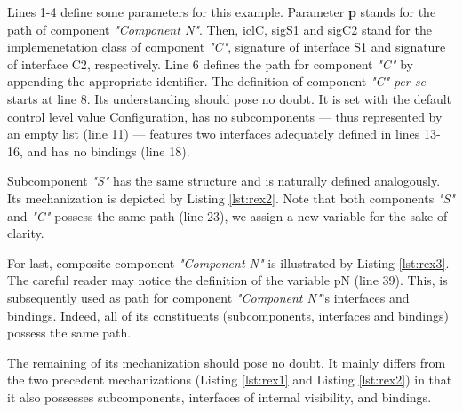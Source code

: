 	
	\noindent Lines 1-4 define some parameters for this example. Parameter \textbf{p}
	stands for the \textsf{path} of \textsf{component} \textit{"Component N"}. Then,
	 \textsf{iclC}, \textsf{sigS1} and \textsf{sigC2} stand for the implemenetation class
	 of \textsf{component} \textit{"C"}, \textsf{signature} of \textsf{interface S1} and 
	 \textsf{signature} of \textsf{interface C2}, respectively. Line 6 defines
	 the \textsf{path} for \textsf{component} \textit{"C"} by appending the appropriate \textsf{identifier}.
	 The definition of \textsf{component} \textit{"C"} \textit{per se} starts at line 8. Its understanding
	 should pose no doubt. It is set with the default control level value \textsf{Configuration},
	 has no subcomponents --- thus represented by an empty list (line 11) --- 
	 features two interfaces adequately
	 defined in lines 13-16, and has no bindings (line 18).
	
	
		
	
	
	\noindent	 Sub\textsf{component} \textit{"S"} has the same structure and 	
	is naturally defined analogously. Its mechanization is depicted by Listing \ref{lst:rex2}.
	Note that both \textsf{component}s \textit{"S"} and \textit{"C"} possess the same 
	\textsf{path} (line 23), we assign a new variable for the sake of clarity.
	 
			
	
	\noindent For last, composite \textsf{component} \textit{"Component N"} is illustrated by
	Listing \ref{lst:rex3}. The careful reader may notice the definition of the variable \textsf{pN}
	(line 39). This, is subsequently used as \textsf{path} for \textsf{component} \textit{"Component N"}'s
	\textsf{interface}s and \textsf{binding}s. Indeed, all of its constituents (sub\textsf{component}s,
	\textsf{interface}s and \textsf{binding}s) possess the same \textsf{path}. 
	
		The remaining of its mechanization should pose no doubt. It mainly differs from
	the two precedent mechanizations (Listing \ref{lst:rex1} and Listing \ref{lst:rex2}) in
	that it also possesses sub\textsf{components}, \textsf{interface}s of \textsf{internal} visibility,
	and \textsf{binding}s.
	

